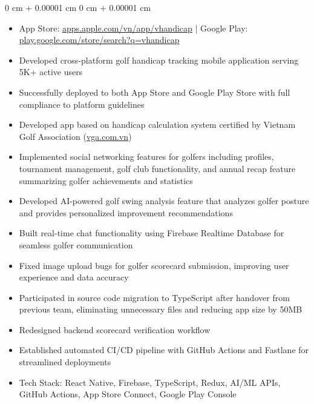 \documentclass[10pt, letterpaper]{article}
\newenvironment{highlights}{
    \begin{itemize}[
        topsep=0.10 cm,
        parsep=0.10 cm,
        partopsep=0pt,
        itemsep=0pt,
        leftmargin=0 cm + 10pt
    ]
}{
    \end{itemize}
} %
\newenvironment{onecolentry}{
    \begin{adjustwidth}{
        0 cm + 0.00001 cm
    }{
        0 cm + 0.00001 cm
    }
}{
    \end{adjustwidth}
} %
\begin{document}
        \begin{onecolentry}
            \begin{highlights}
                \item App Store: \href{https://apps.apple.com/vn/app/vhandicap-handicap-vn-t%E1%BB%AB-vga/id1269491596?l=vi}{apps.apple.com/vn/app/vhandicap} | Google Play: \href{https://play.google.com/store/search?q=vhandicap&c=apps&hl=en}{play.google.com/store/search?q=vhandicap}
                \item Developed cross-platform golf handicap tracking mobile application serving 5K+ active users
                \item Successfully deployed to both App Store and Google Play Store with full compliance to platform guidelines
                \item Developed app based on handicap calculation system certified by Vietnam Golf Association (\href{https://vga.com.vn/}{vga.com.vn})
                \item Implemented social networking features for golfers including profiles, tournament management, golf club functionality, and annual recap feature summarizing golfer achievements and statistics
                \item Developed AI-powered golf swing analysis feature that analyzes golfer posture and provides personalized improvement recommendations
                \item Built real-time chat functionality using Firebase Realtime Database for seamless golfer communication
                \item Fixed image upload bugs for golfer scorecard submission, improving user experience and data accuracy
                \item Participated in source code migration to TypeScript after handover from previous team, eliminating unnecessary files and reducing app size by 50MB
                \item Redesigned backend scorecard verification workflow
                \item Established automated CI/CD pipeline with GitHub Actions and Fastlane for streamlined deployments
                \item Tech Stack: React Native, Firebase, TypeScript, Redux, AI/ML APIs, GitHub Actions, App Store Connect, Google Play Console
            \end{highlights}
        \end{onecolentry}

        \vspace{0.2 cm}
\end{document}
